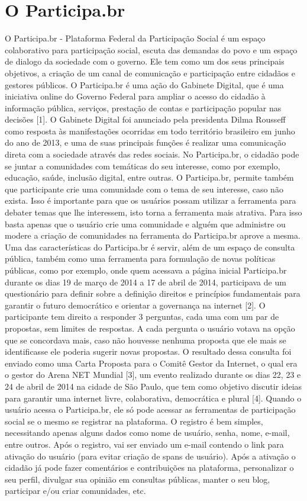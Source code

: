 \chapter{O Participa.br}

O Participa.br - Plataforma Federal da Participação Social é um espaço colaborativo para participação social, escuta das demandas do povo e um espaço de dialogo da sociedade com o governo.
%
Ele tem como um dos seus principais objetivos, a criação de um canal de comunicação e participação entre cidadãos e gestores públicos. O Participa.br é uma ação do Gabinete Digital, que é uma iniciativa online do Governo Federal para ampliar o acesso do cidadão à informação pública, serviços, prestação de contas e participação popular nas decisões [1]. O Gabinete Digital foi anunciado pela presidenta Dilma Rousseff como resposta às manifestações ocorridas em todo território brasileiro em junho do ano de 2013, e uma de suas principais funções é realizar uma comunicação direta com a sociedade através das redes sociais.
%
No Participa.br, o cidadão pode se juntar a comunidades com temáticas do seu interesse, como por exemplo, educação, saúde, inclusão digital, entre outras. O Participa.br, permite também que participante crie uma comunidade com o tema de seu interesse, caso não exista. Isso é importante para que os usuários possam utilizar a ferramenta para debater temas que lhe interessem, isto torna a ferramenta mais atrativa. Para isso basta apenas que o usuário crie uma comunidade e alguém que administre ou modere a criação de comunidades na ferramenta do Participa.br aprove a mesma.
%
Uma das características do Participa.br é servir, além de um espaço de consulta pública, também como uma ferramenta para formulação de novas políticas públicas, como por exemplo, onde quem acessava a página inicial Participa.br durante os dias 19 de março de 2014 a 17 de abril de 2014, participava de um questionário para definir sobre a definição direitos e princípios fundamentais para garantir o futuro democrático e orientar a governança na internet [2]. O participante tem direito a responder 3 perguntas, cada uma com um par de propostas, sem limites de respostas. A cada pergunta o usuário votava na opção que se concordava mais, caso não houvesse nenhuma proposta que ele mais se identificasse ele poderia sugerir novas propostas. O resultado dessa consulta foi enviado como uma Carta Proposta para o Comitê Gestor da Internet, o qual era o gestor do Arena NET Mundial [3], um evento realizado durante os dias 22, 23 e 24 de abril de 2014 na cidade de São Paulo, que tem como objetivo discutir ideias para garantir uma internet livre, colaborativa, democrática e plural [4].
%
Quando o usuário acessa o Participa.br, ele só pode acessar as ferramentas de participação social se o mesmo se registrar na plataforma. O registro é bem simples, necessitando apenas alguns dados como nome de usuário, senha, nome, e-mail, entre outros. Após o registro, vai ser enviado um e-mail contendo o link para ativação do usuário (para evitar criação de spans de usuário). Após a ativação o cidadão já pode fazer comentários e contribuições na plataforma, personalizar o seu perfil, divulgar sua opinião em consultas públicas, manter o seu blog, participar e/ou criar comunidades, etc.

